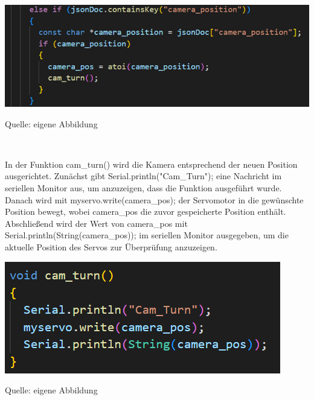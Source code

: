 \documentclass[ngerman,12pt,a4paper]{article}
\begin{document}
				\begin{center}
					\begin{minipage}[t]{\textwidth}
						\includegraphics{Pictures/camerapos}
						\label{fig:camerapos}
						\vspace{-10pt}
						\begin{center}
							\par\small Quelle: eigene Abbildung 
						\end{center}
					\end{minipage} \\[0.70cm]
				\end{center}
				In der Funktion cam\_turn() wird die Kamera entsprechend der neuen Position ausgerichtet. Zunächst gibt Serial.println("Cam\_Turn"); eine Nachricht im seriellen Monitor aus, um anzuzeigen, dass die Funktion ausgeführt wurde. Danach wird mit myservo.write(camera\_pos); der Servomotor in die gewünschte Position bewegt, wobei camera\_pos die zuvor gespeicherte Position enthält. Abschließend wird der Wert von camera\_pos mit Serial.println(String(camera\_pos)); im seriellen Monitor ausgegeben, um die aktuelle Position des Servos zur Überprüfung anzuzeigen.
				
				\begin{center}
					\begin{minipage}[t]{0.7\textwidth}
						\includegraphics{Pictures/camturn}
						\label{fig:camturn}
						\vspace{-10pt}
						\begin{center}
							\par\small Quelle: eigene Abbildung 
						\end{center}
					\end{minipage} \\[0.70cm]
				\end{center}
\end{document}
